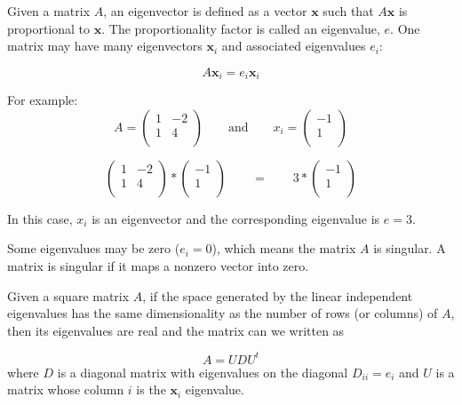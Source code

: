 \documentclass[justified,sixbynine]{tufte-book}
\theoremstyle{plain}%
\theoremstyle{definition}
\theoremstyle{remark}
\begin{document}
\begin{fullwidth}

Given a matrix $A$, an eigenvector is defined as a vector $\mathbf{x}$ such that
$A\mathbf{x}$ is proportional to $\mathbf{x}$.
The proportionality factor is called an eigenvalue, $e$. One matrix may have many eigenvectors $\mathbf{x}_i$ and associated eigenvalues $e_i$:

\begin{equation}
A\mathbf{x}_i = e_i\mathbf{x}_i
\end{equation}

For example:
\begin{equation}
A = \begin{pmatrix}
1 & -2  \\
1 & 4  \\
\end{pmatrix} \qquad \text{and} \qquad
x_i =
\begin{pmatrix}
-1 \\
1 \\
\end{pmatrix}
\end{equation}

\begin{equation}
\begin{pmatrix}
1 & -2  \\
1 & 4  \\
\end{pmatrix} *
\begin{pmatrix}
-1 \\
1 \\
\end{pmatrix} \qquad =  \qquad
3 * \begin{pmatrix}
-1 \\
1 \\
\end{pmatrix}
\end{equation}

In this case, $x_i$ is an eigenvector and the corresponding eigenvalue is $e=3$.

Some eigenvalues may be zero ($e_i=0$), which means the matrix $A$ is singular. A matrix is singular if it maps a nonzero vector into zero.

Given a square matrix $A$, if the space generated by the linear independent eigenvalues has the same dimensionality as the number of rows (or columns) of $A$, then its eigenvalues are real and the matrix can we written as

\begin{equation}
A = U D U^t
\end{equation}
where
$D$ is a diagonal matrix with eigenvalues on the diagonal $D_{ii} = e_i$ and
$U$ is a matrix whose column $i$ is the $\mathbf{x}_i$ eigenvalue.


\end{fullwidth}
\end{document}
